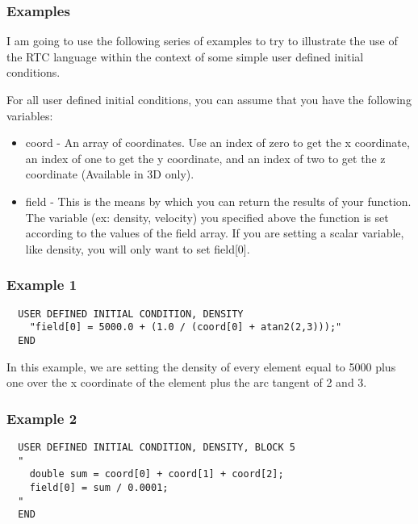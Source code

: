 \subsubsection{Examples}

I am going to use the following series of examples to try to illustrate the
use of the RTC language within the context of some simple user defined initial 
conditions.

\noindent For all user defined initial conditions, you can assume that you have
the following variables: 

\begin{itemize}
  \item coord - An array of coordinates. Use an index of zero to get the x 
                coordinate, an index of one to get the y coordinate, and an
                index of two to get the z coordinate (Available in 3D only).
  \item field - This is the means by which you can return the results of your
                function. The variable (ex: density, velocity) you specified 
                above the function is set according to the values of the field
                array. If you are setting a scalar variable, like density, you
                will only want to set field[0].
\end{itemize}

\subsubsection*{Example 1}

{\ttfamily \begin{verbatim}
  USER DEFINED INITIAL CONDITION, DENSITY
    "field[0] = 5000.0 + (1.0 / (coord[0] + atan2(2,3)));"
  END
\end{verbatim} }

\noindent In this example, we are setting the density of every element
equal to 5000 plus one over the x coordinate of the element plus the
arc tangent of 2 and 3.

\subsubsection*{Example 2}

{\ttfamily \begin{verbatim}
  USER DEFINED INITIAL CONDITION, DENSITY, BLOCK 5
  "
    double sum = coord[0] + coord[1] + coord[2];
    field[0] = sum / 0.0001;
  "
  END
\end{verbatim} }

